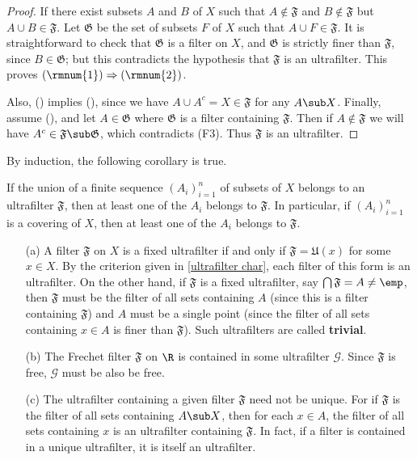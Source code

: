 \begin{proof}
If there exist subsets $A$ and $B$ of $X$ such that $A\notin\mathfrak{F}$ and $B\notin\mathfrak{F}$ but $A\cup B\in\mathfrak{F}$. Let $\mathfrak{G}$ be the set of subsets $F$ of $X$ such that $A\cup F\in\mathfrak{F}$. It is straightforward to check that $\mathfrak{G}$ is a filter on $X$, and $\mathfrak{G}$ is strictly finer than $\mathfrak{F}$, since $B\in\mathfrak{G}$; but this contradicts the hypothesis that $\mathfrak{F}$ is an ultrafilter. This proves $(\rmnum{1})\Rightarrow(\rmnum{2})$.\par
Also, () implies (), since we have $A\cup A^c=X\in\mathfrak{F}$ for any $A\sub X$. Finally, assume (), and let $A\in\mathfrak{G}$ where $\mathfrak{G}$ is a filter containing $\mathfrak{F}$. Then if $A\notin\mathfrak{F}$ we will have $A^c\in\mathfrak{F}\sub\mathfrak{G}$, which contradicts (F3). Thus $\mathfrak{F}$ is an ultrafilter. 
\end{proof}
By induction, the following corollary is true.
\begin{corollary}
If the union of a finite sequence $(A_i)_{i=1}^{n}$ of subsets of $X$ belongs to an ultrafilter $\mathfrak{F}$, then at least one of the $A_i$ belongs to $\mathfrak{F}$. In particular, if $(A_i)_{i=1}^{n}$ is a covering of $X$, then at least one of the $A_i$ belongs to $\mathfrak{F}$.
\end{corollary}
\begin{example}
\mbox{}
\begin{itemize}
\item[(a)] A filter $\mathfrak{F}$ on $X$ is a fixed ultrafilter if and only if $\mathfrak{F}=\mathfrak{U}(x)$ for some $x\in X$. By the criterion given in \cref{ultrafilter char}, each filter of this form is an ultrafilter. On the other hand, if $\mathfrak{F}$ is a fixed ultrafilter, say $\bigcap\mathfrak{F}=A\neq\emp$, then $\mathfrak{F}$ must be the filter of all sets containing $A$ (since this is a filter containing $\mathfrak{F}$) and $A$ must be a single point (since the filter of all sets containing $x\in A$ is finer than $\mathfrak{F}$). Such ultrafilters are called \textbf{trivial}.
\item[(b)] The Frechet filter $\mathfrak{F}$ on $\R$ is contained in some ultrafilter $\mathcal{G}$. Since $\mathfrak{F}$ is free, $\mathcal{G}$ must be also be free.
\item[(c)] The ultrafilter containing a given filter $\mathfrak{F}$ need not be unique. For if $\mathfrak{F}$ is the filter of all sets containing $A\sub X$, then for each $x\in A$, the filter of all sets containing $x$ is an ultrafilter containing $\mathfrak{F}$. In fact, if a filter is contained in a unique ultrafilter, it is itself an ultrafilter.
\end{itemize}
\end{example}
